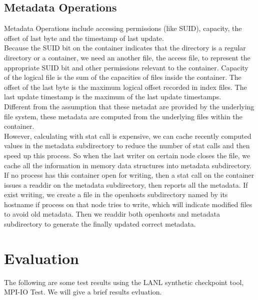 \documentclass[conference]{IEEEtran}
\begin{document}
\subsection{Metadata Operations}
Metadata Operations include accessing permissions (like SUID), capacity, the offset of last byte and the timestamp of last update.
\\Because the SUID bit on the container indicates that the directory is a regular directory or a container, we need an another file, the access file, to represent the appropriate SUID bit and other permissions relevant to the container. Capacity of the logical file is the sum of the capacities of files inside the container. The offset of the last byte is the maximum logical offset recorded in index files. The last update timestamp is the maximum of the last update timestamps.
\\Different from the assumption that these metadat are provided by the underlying file system, these metadata are computed from the underlying files within the container.
\\However, calculating with stat call is expensive, we can cache recently computed values in the metadata subdirectory to reduce the number of stat calls and then speed up this process.  So when the last writer on certain node closes the file, we cache all the information in memory data structures into metadata subdirectory.
\\If no process has this container open for writing, then a stat call on the container issues a readdir on the metadata subdirectory, then reports all the metadata. If exist writing, we create a file in the openhosts subdirectory named by its hostname if process on that node tries to write, which will indicate modified files to avoid old metadata. Then we readdir both openhosts and metadata subdirectory to generate the finally updated correct metadata.

\section{Evaluation}
The following are some test results using the LANL synthetic checkpoint tool, MPI-IO Test. We will give a brief results evluation.
\end{document}
